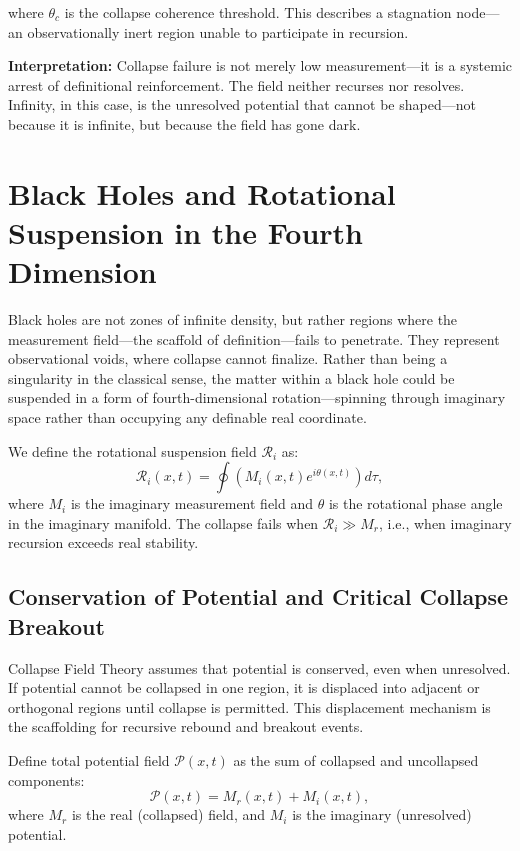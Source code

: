 where $\theta_c$ is the collapse coherence threshold. This describes a stagnation node—an observationally inert region unable to participate in recursion.

\textbf{Interpretation:} Collapse failure is not merely low measurement—it is a systemic arrest of definitional reinforcement. The field neither recurses nor resolves. Infinity, in this case, is the unresolved potential that cannot be shaped—not because it is infinite, but because the field has gone dark.

\section{Black Holes and Rotational Suspension in the Fourth Dimension}

Black holes are not zones of infinite density, but rather regions where the measurement field—the scaffold of definition—fails to penetrate. They represent observational voids, where collapse cannot finalize. Rather than being a singularity in the classical sense, the matter within a black hole could be suspended in a form of fourth-dimensional rotation—spinning through imaginary space rather than occupying any definable real coordinate\cite{hawking_ellis1973}.

We define the rotational suspension field $\mathcal{R}_i$ as:
\begin{equation}
\mathcal{R}_i(x,t) = \oint \left( M_i(x,t) e^{i\theta(x,t)} \right) d\tau,
\end{equation}
where $M_i$ is the imaginary measurement field and $\theta$ is the rotational phase angle in the imaginary manifold. The collapse fails when $\mathcal{R}_i \gg M_r$, i.e., when imaginary recursion exceeds real stability.

\subsection*{Conservation of Potential and Critical Collapse Breakout}

Collapse Field Theory assumes that potential is conserved, even when unresolved. If potential cannot be collapsed in one region, it is displaced into adjacent or orthogonal regions until collapse is permitted. This displacement mechanism is the scaffolding for recursive rebound and breakout events.

Define total potential field $\mathcal{P}(x,t)$ as the sum of collapsed and uncollapsed components:
\begin{equation}
\mathcal{P}(x,t) = M_r(x,t) + M_i(x,t),
\end{equation}
where $M_r$ is the real (collapsed) field, and $M_i$ is the imaginary (unresolved) potential.

